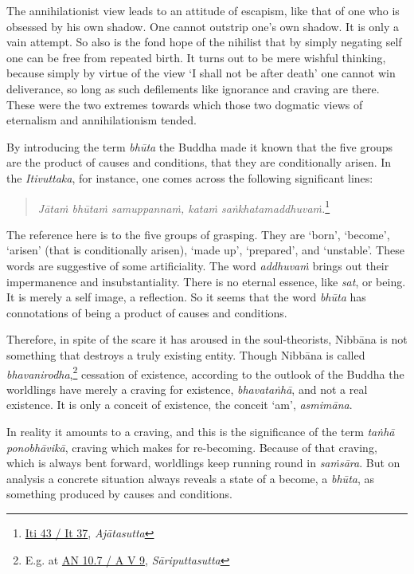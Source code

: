 The annihilationist view leads to an attitude of escapism, like that of one who is obsessed by his own shadow. One cannot outstrip one's own shadow. It is only a vain attempt. So also is the fond hope of the nihilist that by simply negating self one can be free from repeated birth. It turns out to be mere wishful thinking, because simply by virtue of the view `I shall not be after death' one cannot win deliverance, so long as such defilements like ignorance and craving are there. These were the two extremes towards which those two dogmatic views of eternalism and annihilationism tended.

By introducing the term \emph{bhūta} the Buddha made it known that the five groups are the product of causes and conditions, that they are conditionally arisen. In the \emph{Itivuttaka}, for instance, one comes across the following significant lines:

\begin{quote}
\emph{Jātaṁ bhūtaṁ samuppannaṁ, kataṁ saṅkhatamaddhuvaṁ.}\footnote{\href{https://suttacentral.net/iti43/pli/ms}{Iti 43 / It 37}, \emph{Ajātasutta}}
\end{quote}

The reference here is to the five groups of grasping. They are `born', `become', `arisen' (that is conditionally arisen), `made up', `prepared', and `unstable'. These words are suggestive of some artificiality. The word \emph{addhuvaṁ} brings out their impermanence and insubstantiality. There is no eternal essence, like \emph{sat}, or being. It is merely a self image, a reflection. So it seems that the word \emph{bhūta} has connotations of being a product of causes and conditions.

Therefore, in spite of the scare it has aroused in the soul-theorists, Nibbāna is not something that destroys a truly existing entity. Though Nibbāna is called \emph{bhavanirodha},\footnote{E.g. at \href{https://suttacentral.net/an10.7/pli/ms}{AN 10.7 / A V 9}, \emph{Sāriputtasutta}} cessation of existence, according to the outlook of the Buddha the worldlings have merely a craving for existence, \emph{bhavataṅhā}, and not a real existence. It is only a conceit of existence, the conceit `am', \emph{asmimāna}.

In reality it amounts to a craving, and this is the significance of the term \emph{taṅhā ponobhāvikā}, craving which makes for re-becoming. Because of that craving, which is always bent forward, worldlings keep running round in \emph{saṁsāra}. But on analysis a concrete situation always reveals a state of a become, a \emph{bhūta}, as something produced by causes and conditions.

